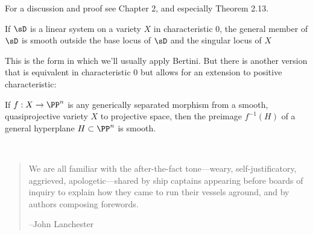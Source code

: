 For a discussion and proof see \cite{Eisenbud1995} Chapter 2, and especially Theorem 2.13. 


\begin{theorem}[Bertini]\label{bertini}
If $\sD$ is a linear system on a variety $X$ in characteristic 0, the general member of $\sD$ is smooth outside the base locus of $\sD$ and the singular locus of $X$
\end{theorem}

This is the form in which we'll usually apply Bertini. But there is another version that is equivalent in characteristic 0 but allows for an extension to positive characteristic:


\begin{theorem}[Bertini]\label{bertini2}
If $f : X \to \PP^n$ is any generically separated morphism from a smooth, quasiprojective variety $X$ to projective space, then the preimage $f^{-1}(H)$ of a general hyperplane $H \subset \PP^n$ is smooth.
\end{theorem}


\newpage

\

\begin{quote}
\small\sf
We are all familiar with the after-the-fact tone---weary, self-justificatory, aggrieved, apologetic---shared by ship captains appearing before boards of inquiry to explain how they came to run their vessels aground, and by authors composing forewords.

--John Lanchester 
\bigskip

\end{quote}



\



